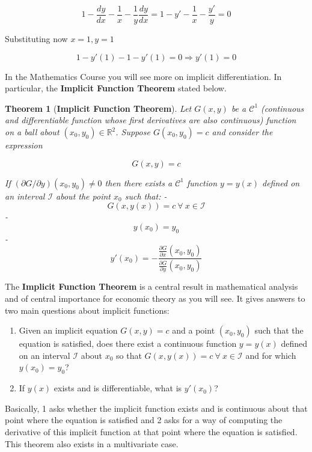 \documentclass[11pt]{article}
\providecommand{\tightlist}{%
      \setlength{\itemsep}{0pt}\setlength{\parskip}{0pt}}
\theoremstyle{definition}
\theoremstyle{plain}
\newtheorem{theorem}{Theorem}
\begin{document}
\[
1 - \frac{dy}{dx}-\frac{1}{x}-\frac{1}{y}\frac{dy}{dx} = 1 - y' - \frac{1}{x}-\frac{y'}{y} = 0
\]

Substituting now \(x = 1, y = 1\)

\[
1 - y'(1) - 1 - y'(1) = 0 \Rightarrow y'(1) = 0
\]

In the Mathematics Course you will see more on implicit differentiation.
In particular, the \textbf{Implicit Function Theorem} stated below.

\begin{theorem}[\textbf{Implicit Function Theorem}] 
Let \(G(x, y)\) be a \(\mathcal{C}^1\) (continuous and differentiable function whose first
derivatives are also continuous) function on a ball about
\((x_0, y_0)\in\mathbb{R}^2\). Suppose \(G(x_0, y_0) = c\) and consider
the expression

\[
G(x, y) = c
\]

If \(\left(\partial G / \partial y\right)(x_0, y_0) \neq 0\) then there
exists a \(\mathcal{C}^1\) function \(y = y(x)\) defined on an interval
\(\mathcal{I}\) about the point \(x_0\) such that: -
\[G\left(x,y(x)\right) = c \ \forall \ x\in\mathcal{I}\] -
\[y(x_0) = y_0\] -
\[y'(x_0) = -\frac{\frac{\partial G}{\partial x}(x_0, y_0)}{\frac{\partial G}{\partial y}(x_0, y_0)}\]
\end{theorem}

The \textbf{Implicit Function Theorem} is a central result in
mathematical analysis and of central importance for economic theory as
you will see. It gives answers to two main questions about implicit
functions:

\begin{enumerate}
\def\labelenumi{\arabic{enumi}.}
\tightlist
\item
  Given an implicit equation \(G(x,y) = c\) and a point \((x_0, y_0)\)
  such that the equation is satisfied, does there exist a continuous
  function \(y = y(x)\) defined on an interval \(\mathcal{I}\) about
  \(x_0\) so that
  \(G\left(x, y(x)\right) = c \ \forall \ x\in\mathcal{I}\) and for
  which \(y(x_0) = y_0\)?
\item
  If \(y(x)\) exists and is differentiable, what is \(y'(x_0)\)?
\end{enumerate}

Basically, 1 asks whether the implicit function exists and is continuous
about that point where the equation is satisfied and 2 asks for a way of
computing the derivative of this implicit function at that point where
the equation is satisfied. This theorem also exists in a multivariate
case.
\end{document}
